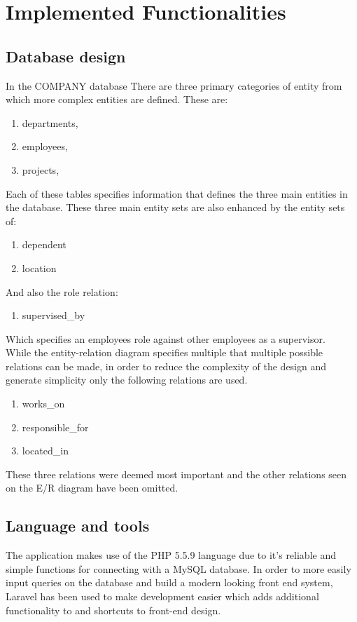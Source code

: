 \documentclass[fleqn, 11pt,letterpaper]{article}
\begin{document}
\section{Implemented Functionalities}
\subsection{Database design}
In the COMPANY database There are three primary categories of entity from which more complex entities are defined. These are:
\begin{enumerate}[]
	\item departments, 
	\item employees,
	\item projects,
\end{enumerate}
Each of these tables specifies information that defines the three main entities in the database. These three main entity sets are also enhanced by the entity sets of:
\begin{enumerate}[]
	\item dependent 
	\item location	
\end{enumerate}	
And also the role relation:
\begin{enumerate}[]	
	\item supervised\_by 	
\end{enumerate}
Which specifies an employees role against other employees as a supervisor.\\
While the entity-relation diagram specifies multiple that multiple possible relations can be made, in order to reduce the complexity of the design and generate simplicity only the following relations are used.
\begin{enumerate}[]
	\item works\_on
	\item responsible\_for
	\item located\_in
\end{enumerate}
These three relations were deemed most important and the other relations seen on the E/R diagram have been omitted.

\subsection{Language and tools}
	The application makes use of the PHP 5.5.9 language due to it's reliable and simple functions for connecting with a MySQL database. In order to more easily input queries on the database and build a modern looking front end system, Laravel has been used to make development easier which adds additional functionality to and shortcuts to front-end design.\\
\end{document}
